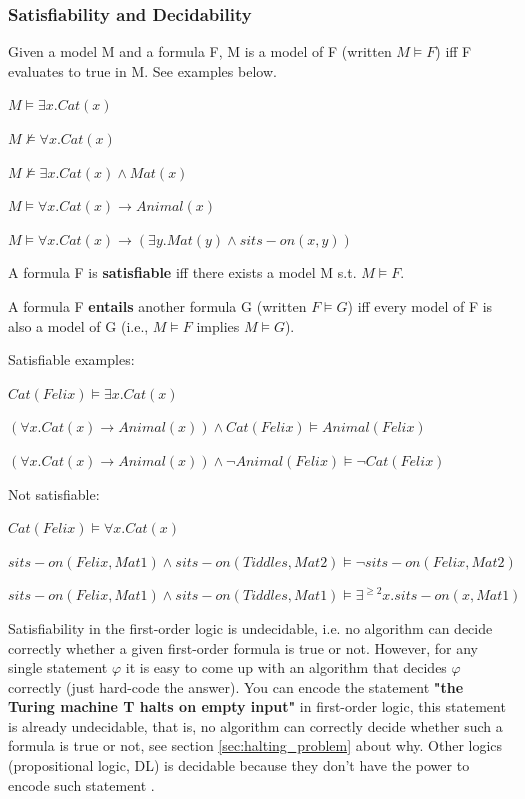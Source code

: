 \subsubsection{Satisfiability and Decidability}
\label{sec:satisfiability_decidability}

Given a model M and a formula F, M is a model of F (written $M \models F$) iff F evaluates to true in M.
See examples below.

$M \models \exists x.Cat(x)$

$M \not\models \forall x.Cat(x)$

$M \not\models \exists x.Cat(x) \land Mat(x)$

$M \models \forall x.Cat(x) \rightarrow Animal(x)$

$M \models \forall x.Cat(x) \rightarrow (\exists y.Mat(y) \land sits-on(x,y))$

A formula F is \textbf{satisfiable} iff there exists a model M s.t. $M \models F$.

A formula F \textbf{entails} another formula G (written $F \models G$) iff every model of F 
is also a model of G (i.e., $M \models F$ implies $M \models G$). 

Satisfiable examples:

$Cat(Felix) \models \exists x.Cat(x)$

$(\forall x.Cat(x) \rightarrow Animal(x)) \land Cat(Felix) \models Animal(Felix)$

$(\forall x.Cat(x) \rightarrow Animal(x)) \land \neg Animal(Felix) \models \neg Cat(Felix)$

Not satisfiable:

$Cat(Felix) \models \forall x.Cat(x)$

$sits-on(Felix, Mat1) \land sits-on(Tiddles, Mat2) \models \neg sits-on(Felix, Mat2)$

$sits-on(Felix, Mat1) \land sits-on(Tiddles, Mat1) \models \exists^{\geq 2} x.sits-on(x, Mat1)$

Satisfiability in the first-order logic is undecidable, i.e. no algorithm can decide correctly whether a given first-order formula is true or not. However, for any single statement $\varphi$ it is easy to come up with an algorithm that decides $\varphi$ correctly (just hard-code the answer). 
You can encode the statement \textbf{"the Turing machine T halts on empty input"} in first-order logic, this statement is already undecidable, that is, no algorithm can correctly decide whether such a formula is true or not, 
see section \ref{sec:halting_problem} about why. 
Other logics (propositional logic, DL) is decidable because they don't have the power to encode such statement \cite{30672}.


